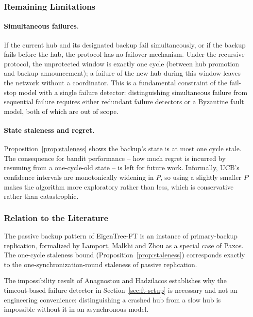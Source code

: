 \documentclass{article}
\newcommand{\merwft}{EigenTree-FT}
\begin{document}
\subsubsection{Remaining Limitations}

\paragraph{Simultaneous failures.}
If the current hub and its designated backup fail simultaneously, or if the backup fails
before the hub, the protocol has no failover mechanism. Under the recursive protocol,
the unprotected window is exactly one cycle (between hub promotion and backup
announcement); a failure of the new hub during this window leaves the network without a
coordinator. This is a fundamental constraint of the fail-stop model with a single
failure detector: distinguishing simultaneous failure from sequential failure requires
either redundant failure detectors or a Byzantine fault model, both of which are out of
scope.

\paragraph{State staleness and regret.}
Proposition~\ref{prop:staleness} shows the backup's state is at most one cycle stale.
The consequence for bandit performance -- how much regret is incurred by resuming from a
one-cycle-old state -- is left for future work. Informally, UCB's confidence intervals
are monotonically widening in $P$, so using a slightly smaller $P$ makes the algorithm
more exploratory rather than less, which is conservative rather than catastrophic.

\subsubsection{Relation to the Literature}

The passive backup pattern of \merwft{} is an instance of primary-backup replication,
formalized by Lamport, Malkhi and Zhou \citep{lamport2009vertical} as a special case of
Paxos. The one-cycle staleness bound (Proposition~\ref{prop:staleness}) corresponds
exactly to the one-synchronization-round staleness of passive replication.

The impossibility result of Anagnostou and Hadzilacos \citep{anagnostou1993} establishes
why the timeout-based failure detector in Section~\ref{sec:ft-setup} is necessary and not
an engineering convenience: distinguishing a crashed hub from a slow hub is impossible
without it in an asynchronous model.
\end{document}
